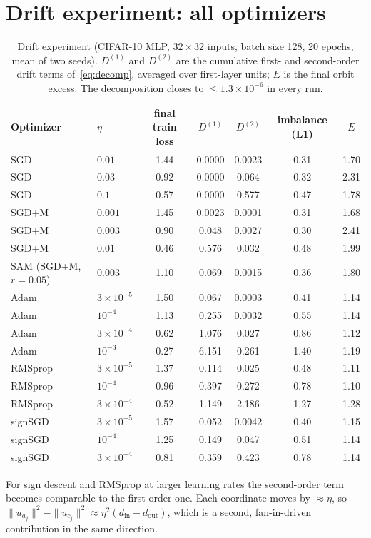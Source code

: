 \documentclass[10pt]{article}
\theoremstyle{remark}
\begin{document}
\section{Drift experiment: all optimizers}\label{app:drift}
\begin{table}[h]
\centering
\small
\caption{Drift experiment (CIFAR-10 MLP, $32{\times}32$ inputs, batch size 128, 20 epochs, mean of two seeds). $D^{(1)}$ and $D^{(2)}$ are the cumulative first- and second-order drift terms of~\eqref{eq:decomp}, averaged over first-layer units; $E$ is the final orbit excess. The decomposition closes to $\le1.3\times10^{-6}$ in every run.}
\label{tab:drift}
\begin{tabular}{llccccc}
\toprule
Optimizer & $\eta$ & final train loss & $D^{(1)}$ & $D^{(2)}$ & imbalance (L1) & $E$\\
\midrule
SGD & $0.01$ & 1.44 & $0.0000$ & 0.0023 & 0.31 & 1.70\\
SGD & $0.03$ & 0.92 & $0.0000$ & 0.064 & 0.32 & 2.31\\
SGD & $0.1$ & 0.57 & $0.0000$ & 0.577 & 0.47 & 1.78\\
SGD+M & $0.001$ & 1.45 & 0.0023 & 0.0001 & 0.31 & 1.68\\
SGD+M & $0.003$ & 0.90 & 0.048 & 0.0027 & 0.30 & 2.41\\
SGD+M & $0.01$ & 0.46 & 0.576 & 0.032 & 0.48 & 1.99\\
SAM (SGD+M, $r=0.05$) & $0.003$ & 1.10 & 0.069 & 0.0015 & 0.36 & 1.80\\
\midrule
Adam & $3{\times}10^{-5}$ & 1.50 & 0.067 & 0.0003 & 0.41 & 1.14\\
Adam & $10^{-4}$ & 1.13 & 0.255 & 0.0032 & 0.55 & 1.14\\
Adam & $3{\times}10^{-4}$ & 0.62 & 1.076 & 0.027 & 0.86 & 1.12\\
Adam & $10^{-3}$ & 0.27 & 6.151 & 0.261 & 1.40 & 1.19\\
RMSprop & $3{\times}10^{-5}$ & 1.37 & 0.114 & 0.025 & 0.48 & 1.11\\
RMSprop & $10^{-4}$ & 0.96 & 0.397 & 0.272 & 0.78 & 1.10\\
RMSprop & $3{\times}10^{-4}$ & 0.52 & 1.149 & 2.186 & 1.27 & 1.28\\
signSGD & $3{\times}10^{-5}$ & 1.57 & 0.052 & 0.0042 & 0.40 & 1.15\\
signSGD & $10^{-4}$ & 1.25 & 0.149 & 0.047 & 0.51 & 1.14\\
signSGD & $3{\times}10^{-4}$ & 0.81 & 0.359 & 0.423 & 0.78 & 1.14\\
\bottomrule
\end{tabular}
\end{table}
For sign descent and RMSprop at larger learning rates the second-order term becomes comparable to the first-order one. Each coordinate moves by $\approx\eta$, so $\|u_{a_j}\|^2-\|u_{c_j}\|^2\approx\eta^2(d_{\mathrm{in}}-d_{\mathrm{out}})$, which is a second, fan-in-driven contribution in the same direction.
\end{document}
